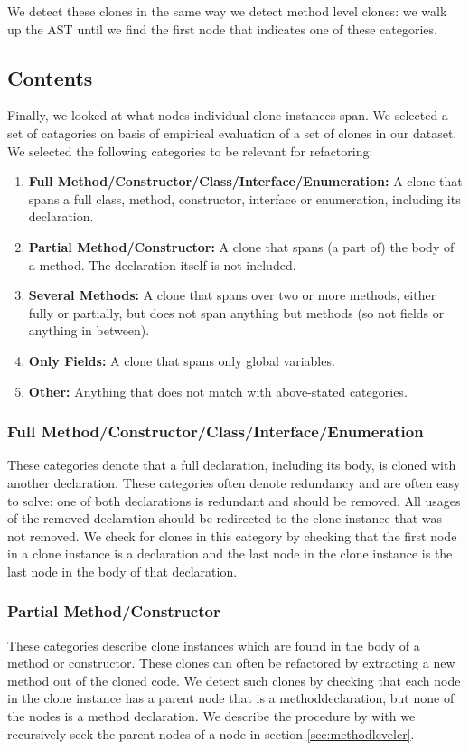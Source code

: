 We detect these clones in the same way we detect method level clones: we walk up the AST until we find the first node that indicates one of these categories.

\subsection{Contents}\label{sec:setupcontents}
Finally, we looked at what nodes individual clone instances span. We selected a set of catagories on basis of empirical evaluation of a set of clones in our dataset. We selected the following categories to be relevant for refactoring:
\begin{enumerate}
  \item \textbf{Full Method/Constructor/Class/Interface/Enumeration:} A clone that spans a full class, method, constructor, interface or enumeration, including its declaration.
  \item \textbf{Partial Method/Constructor:} A clone that spans (a part of) the body of a method. The declaration itself is not included.
  \item \textbf{Several Methods:} A clone that spans over two or more methods, either fully or partially, but does not span anything but methods (so not fields or anything in between).
  \item \textbf{Only Fields:} A clone that spans only global variables.
  \item \textbf{Other:} Anything that does not match with above-stated categories.
\end{enumerate}

\subsubsection{Full Method/Constructor/Class/Interface/Enumeration}
These categories denote that a full declaration, including its body, is cloned with another declaration. These categories often denote redundancy and are often easy to solve: one of both declarations is redundant and should be removed. All usages of the removed declaration should be redirected to the clone instance that was not removed. We check for clones in this category by checking that the first node in a clone instance is a declaration and the last node in the clone instance is the last node in the body of that declaration.

\subsubsection{Partial Method/Constructor}
These categories describe clone instances which are found in the body of a method or constructor. These clones can often be refactored by extracting a new method out of the cloned code. We detect such clones by checking that each node in the clone instance has a parent node that is a methoddeclaration, but none of the nodes is a method declaration. We describe the procedure by with we recursively seek the parent nodes of a node in section \ref{sec:methodlevelcr}.

